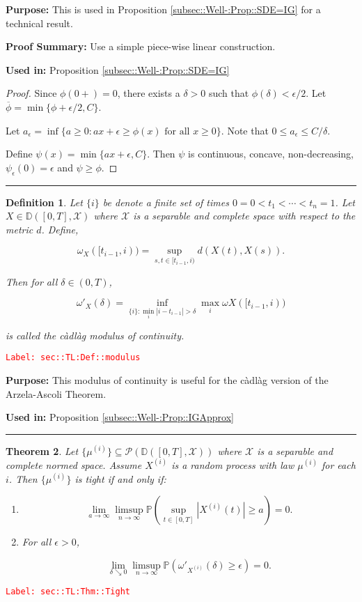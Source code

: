 \documentclass[12pt]{article}
\newcommand{\mb}{\mathbb}
\newcommand{\mc}{\mathcal}
\newcommand{\ra}{\rightarrow}
\newcommand{\ov}{\overline}
\newcommand{\te}{\text}
\newcommand{\ep}{\epsilon}
\newcommand{\tr}{\textcolor{red}}
\newcommand{\labe}[1]{\tr{\texttt{Label: #1}}}
\newcommand{\purpose}{\textbf{Purpose: }}
\newcommand{\pfsum}{\textbf{Proof Summary: }}
\newcommand{\usein}{\textbf{Used in: }}
\newcommand{\ind}{\hspace{24pt}}
\newcommand{\lin}{\rule{\linewidth}{0.4 pt}}
\newcommand{\pr}{\mb{P}}							%
\newcommand{\cad}{\mb{D}}							%
\newcommand{\x}{x}								%
\renewcommand{\t}{t}							%
\renewcommand{\tt}{s}							%
\newcommand{\X}{X}								%
\newcommand{\tp}[1]{(#1)}						%
\newcommand{\sln}[1]{^{(#1)}}					%
\newcommand{\modu}{\omega}						%
\newcommand{\cmodu}{\omega'}					%
\newcommand{\pra}[1]{_{#1}}						%
\newcommand{\indx}[1]{_{#1}}					%
\newcommand{\m}{\mu}							%
\newcommand{\spce}{\mc{X}}						%
\newtheorem{thms}{Theorem}[section]
\newtheorem{defn}[thms]{Definition}
\begin{document}
\purpose This is used in Proposition \ref{subsec::Well-:Prop::SDE=IG} for a technical result.

\pfsum Use a simple piece-wise linear construction.

\usein Proposition \ref{subsec::Well-:Prop::SDE=IG}



\begin{proof}
Since \(\phi(0+) = 0\), there exists a \(\delta > 0\) such that \(\phi(\delta) < \ep/2\). Let \(\ov{\phi} = \min\{\phi+\ep/2, C\}\).

\ind Let \(a_\ep = \inf\{a \geq 0: a\x + \ep \geq \phi(\x)\te{ for all } \x\geq 0\}\). Note that \(0\leq a_\ep \leq C/\delta\). 

\ind Define \(\psi(\x) = \min\{a\x+\ep,C\}\). Then \(\psi\) is continuous, concave, non-decreasing, \(\psi_\ep(0) = \ep\) and \(\psi \geq \phi\).
\end{proof}

\lin

\begin{defn}
Let \(\{	{i}\}\) be denote a finite set of times \(0=	{0} <\t\indx{1} <\cdots < \t\indx{n}=1\). Let \(\X\in \cad([0,T],\spce)\) where \(\spce\) is a separable and complete space with respect to the metric \(d\). Define,

\[\modu\pra{\X}([\t\indx{i-1},	{i})) = \sup_{\tt,\t\in [\t\indx{i-1},	{i})} d(\X\tp{\t},\X\tp{\tt}).\]

Then for all \(\delta \in (0,T)\),

\[\cmodu\pra{\X}(\delta) = \inf_{\{	{i}\}: \min_i |	{i} - \t\indx{i-1}| > \delta} \max_{i} \modu{\X}([\t\indx{i-1},	{i}))\]

is called the c\`adl\`ag modulus of continuity.
\label{sec::TL:Def::modulus}
\end{defn}
\labe{sec::TL:Def::modulus}

\purpose This modulus of continuity is useful for the c\`adl\`ag version of the Arzela-Ascoli Theorem.

\usein Proposition \ref{subsec::Well-:Prop::IGApprox}

\lin

\begin{thms}
Let \(\{\m\sln{i}\}\subseteq \mc{P}\left(\cad([0,T],\spce)\right)\) where \(\spce\) is a separable and complete normed space. Assume \(\X\sln{i}\) is a random process with law \(\m\sln{i}\) for each \(i\). Then \(\{\m\sln{i}\}\) is tight if and only if:

\begin{enumerate}[(1)]
\item 

\[\lim_{a \ra \infty}\limsup_{n \ra\infty} \pr\left(\sup_{\t \in [0,T]} |\X\sln{i}\tp{\t}| \geq a\right) = 0.\]

\item For all \(\ep > 0\),

\[\lim_{\delta \searrow 0}\limsup_{n\ra\infty} \pr\left(\cmodu\pra{\X\sln{i}}(\delta) \geq \ep\right) = 0.\]
\end{enumerate}
\label{sec::TL:Thm::Tight}
\end{thms}
\labe{sec::TL:Thm::Tight}
\end{document}
